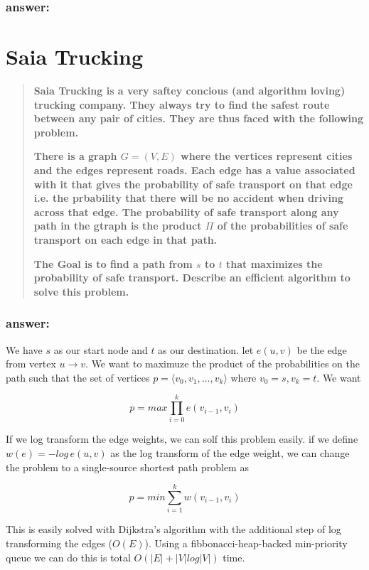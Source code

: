 \documentclass[titlepage]{article}\usepackage[]{graphicx}\usepackage[]{color}
\begin{document}
\subsubsection{answer:}
\vspace{5cm}

\section{Saia Trucking}
\begin{quote}
  \textbf{Saia Trucking is a very saftey concious (and algorithm loving)
  trucking company. They always try to find the safest route between any pair
of cities. They are thus faced with the following problem.}

\textbf{There is a graph $G = (V,E)$ where the vertices represent cities and the edges
represent roads. Each edge has a value associated with it that gives the
probability of safe transport on that edge i.e. the prbability that there will
be no accident when driving across that edge. The probability of safe transport
along any path in the gtraph is the product $\Pi$ of the probabilities of safe
transport on each edge in that path.}

\textbf{The Goal is to find a path from $s$ to $t$ that maximizes the probability of
safe transport. Describe an efficient algorithm to solve this problem.  }
\end{quote}
\subsubsection{answer:}
We have $s$ as our start node and $t$ as our destination. let $e(u,v)$ be the
edge from vertex $u \rightarrow v$. We want to maximuze the product of the
probabilities on the path such that the set of vertices $p = \langle v_0, v_1,
\dots, v_k \rangle$ where $v_0 = s, v_k = t$. We want

\[ p = max \prod_{i = 0}^{k} e(v_{i-1}, v_i) \]

If we log transform the edge weights, we can solf this problem easily. if we
define $w(e) = - log \, e(u,v)$ as the log transform of the edge weight, we can
change the problem to  a single-source shortest path problem as 

\[ p = min \sum_{i=1}^{k} w(v_{i-1}, v_i) \]

This is easily solved with Dijkstra's algorithm with the additional step of log
transforming the edges ($O(E)$). Using a fibbonacci-heap-backed min-priority
queue we can do this is total $O(|E| + |V| log |V|)$ time.
\end{document}
